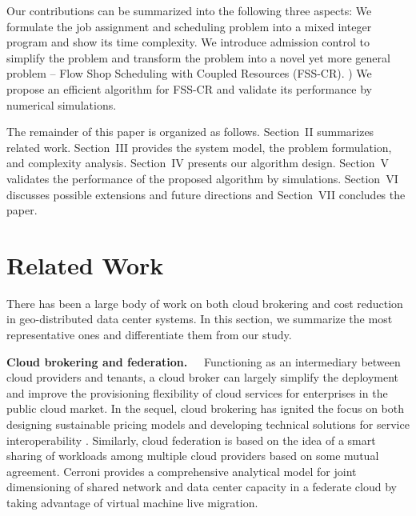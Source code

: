 \documentclass{article}
\newcommand{\bpara}[2]{\noindent\textbf{#1~~}{#2}}
\begin{document}
Our contributions can be summarized into the following three aspects:  We formulate the job assignment and scheduling problem into a mixed integer program and show its time complexity.  We introduce admission control to simplify the problem and transform the problem into a novel yet more general problem -- Flow Shop Scheduling with Coupled Resources (FSS-CR). ) We propose an efficient algorithm for FSS-CR and validate its performance by numerical simulations.

The remainder of this paper is organized as follows. Section~II summarizes related work. Section~III provides the system model, the problem formulation, and complexity analysis. Section~IV presents our algorithm design. Section~V validates the performance of the proposed algorithm by simulations. Section~VI discusses possible extensions and future directions and Section~VII concludes the paper.

    
\section{Related Work}
\label{sec:related}

There has been a large body of work on both cloud brokering and cost reduction in geo-distributed data center systems. In this section, we summarize the most representative ones and differentiate them from our study.

\bpara{Cloud brokering and federation.}{
Functioning as an intermediary between cloud providers and tenants, a cloud broker can largely simplify the deployment and improve the provisioning flexibility of cloud services for enterprises in the public cloud market. In the sequel, cloud brokering has ignited the focus on both designing sustainable pricing models and developing technical solutions for service interoperability \cite{Guzek-CSB-2015}. Similarly, cloud federation is based on the idea of a smart sharing of workloads among multiple cloud providers based on some mutual agreement. Cerroni \cite{Cerroni-DCC-2014} provides a comprehensive analytical model for joint dimensioning of shared network and data center capacity in a federate cloud by taking advantage of virtual machine live migration. }
\end{document}
